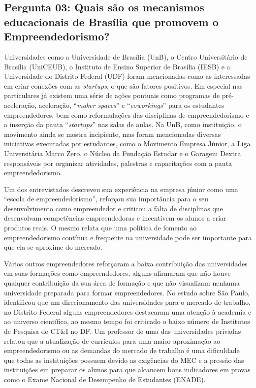 \subsection*{Pergunta 03: Quais são os mecanismos educacionais de Brasília que promovem o Empreendedorismo?}
\label{subsection:pergunta_de_pesquisa_3}

Universidades como a Universidade de Brasília (UnB), o Centro Universitário de Brasília (UniCEUB), o Instituto de Ensino Superior de Brasília (IESB) e a Universidade do Distrito Federal (UDF) foram mencionadas como as  interessadas em criar conexões com as \textit{startups}, o que são fatores positivos. Em especial nas particulares já existem uma série de ações pontuais como programas de pré-aceleração, aceleração, ``\textit{maker spaces}'' e ``\textit{coworkings}'' para os estudantes empreendedores, bem como reformulações das disciplinas de empreendedorismo e a inserção da pauta ``\textit{startups}'' nas salas de aulas. Na UnB, como instituição, o movimento ainda se mostra incipiente, mas foram mencionadas diversas iniciativas executadas por estudantes, como o Movimento Empresa Júnior, a Liga Universitária Marco Zero, o Núcleo da Fundação Estudar e o Garagem Dextra responsáveis por organizar atividades, palestras e capacitações com a pauta empreendedorismo. 

Um dos entrevistados descreveu sua experiência na empresa júnior como uma ``escola de empreendedorismo'', reforçou sua importância para o seu desenvolvimento como empreendedor e criticou a falta de disciplinas que desenvolvam competências empreendedoras e incentivem os alunos a criar produtos reais. O mesmo relata que uma política de fomento ao empreendedorismo contínua e frequente na universidade pode ser importante para que ela se aproxime do mercado. 

Vários outros empreendedores reforçaram a baixa contribuição das universidades em suas formações como empreendedores, alguns afirmaram que não houve qualquer contribuição da sua área de formação e que não visualizam nenhuma universidade preparada para formar empreendedores. No estudo sobre São Paulo,  identificou que um direcionamento das universidades para o mercado de trabalho, no Distrito Federal alguns empreendedores destacaram uma atenção à academia e ao universo científico, ao mesmo tempo foi criticado o baixo número de Institutos de Pesquisa de CT\&I no DF. Um professor de uma das universidades privadas relatou que a atualização de currículos para uma maior aproximação ao empreendedorismo ou as demandas do mercado de trabalho é uma dificuldade que todas as instituições possuem devido as exigências do MEC e a pressão das instituições em preparar os alunos para que alcancem bons indicadores em provas como o Exame Nacional de Desempenho de Estudantes (ENADE). 

